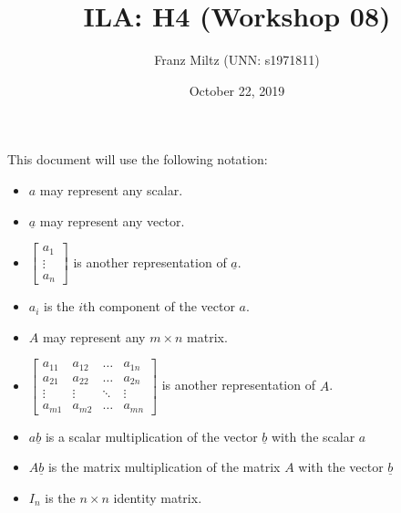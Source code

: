 \documentclass{article}
\title{ILA: H4 (Workshop 08)}
\author{Franz Miltz (UNN: s1971811)}
\date{October 22, 2019}
\renewcommand{\vec}{\underline}
\begin{document}
\maketitle
This document will use the following notation:
\begin{itemize}
    \item $a$ may represent any scalar.
    \item $\vec{a}$ may represent any vector.
    \item $\begin{bmatrix}
        a_1\\
        \vdots\\
        a_n
    \end{bmatrix}$ is another representation of $\vec a$. 
    \item $a_i$ is the $i$th component of the vector $a$.
    \item $A$ may represent any $m\times n$ matrix.
    \item $\begin{bmatrix}
        a_{11} & a_{12}&\dots &a_{1n}\\
        a_{21} & a_{22}&\dots &a_{2n}\\
        \vdots & \vdots & \ddots & \vdots\\
        a_{m1} & a_{m2} &\dots &a_{mn}
    \end{bmatrix}$ is another representation of $A$.
    \item $a\vec{b}$ is a scalar multiplication of the vector $\vec{b}$ with the scalar $a$
    \item $A\vec b$ is the matrix multiplication of the matrix $A$ with the vector $\vec b$
    \item $I_n$ is the $n\times n$ identity matrix.
\end{itemize}
\end{document}
